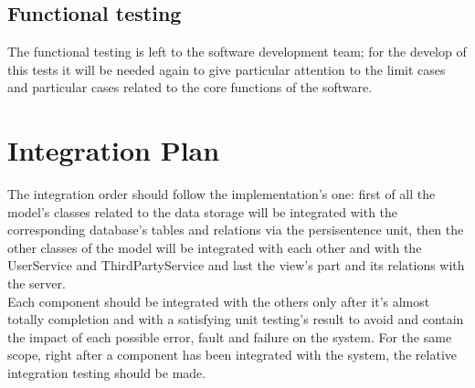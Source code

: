 \subsection{Functional testing}
	The functional testing is left to the software development team; for the develop of this tests it will be needed again to give particular attention to the limit cases and particular cases 		related to the core functions of the software.
\section{Integration Plan}
The integration order should follow the implementation's one: first of all the model's classes related to the data storage will be integrated with the corresponding database's tables and relations via the persisentence unit, then  the other classes of the model will be integrated with each other and with the UserService and ThirdPartyService and last the view's part and its relations with the server.\\ 
Each component should be integrated with the others only after it's almost totally completion and with a satisfying unit testing's result to avoid and contain the impact of each possible error, fault and failure on the system. For the same scope, right after a component has been integrated with the system, the relative integration testing should be made. 






